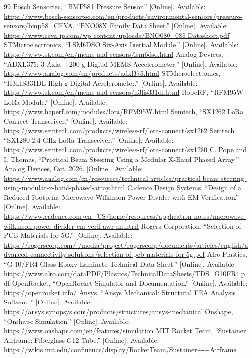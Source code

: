 \documentclass[11pt]{IEEEtran}
\begin{document}
\begin{thebibliography}{99}
 Bosch Sensortec, ``BMP581 Pressure Sensor.'' [Online]. Available: \url{https://www.bosch-sensortec.com/en/products/environmental-sensors/pressure-sensors/bmp581}
 CEVA, ``BNO08X Family Data Sheet.'' [Online]. Available: \url{https://www.ceva-ip.com/wp-content/uploads/BNO080_085-Datasheet.pdf}
 STMicroelectronics, ``LSM6DSO Six-Axis Inertial Module.'' [Online]. Available: \url{https://www.st.com/en/mems-and-sensors/lsm6dso.html}
 Analog Devices, ``ADXL375: 3-Axis, $\pm200$ g Digital MEMS Accelerometer.'' [Online]. Available: \url{https://www.analog.com/en/products/adxl375.html}
 STMicroelectronics, ``H3LIS331DL High-g Digital Accelerometer.'' [Online]. Available: \url{https://www.st.com/en/mems-and-sensors/h3lis331dl.html}
 HopeRF, ``RFM95W LoRa Module.'' [Online]. Available: \url{https://www.hoperf.com/modules/lora/RFM95W.html}
 Semtech, ``SX1262 LoRa Connect Transceiver.'' [Online]. Available: \url{https://www.semtech.com/products/wireless-rf/lora-connect/sx1262}
 Semtech, ``SX1280 2.4-GHz LoRa Transceiver.'' [Online]. Available: \url{https://www.semtech.com/products/wireless-rf/lora-connect/sx1280}
 C. Pope and I. Thomas, ``Practical Beam Steering Using a Modular X-Band Phased Array,'' Analog Devices, Oct. 2026. [Online]. Available: \url{https://www.analog.com/en/resources/technical-articles/practical-beam-steering-using-modular-x-band-phased-array.html}
 Cadence Design Systems, ``Design of a Reduced Footprint Microwave Wilkinson Power Divider with EM Verification.'' [Online]. Available: \url{https://www.cadence.com/en_US/home/resources/application-notes/microwave-wilkinson-power-divider-em-verif-awr-an.html}
 Rogers Corporation, ``Selection of PCB Materials for 5G.'' [Online]. Available: \url{https://rogerscorp.com/-/media/project/rogerscorp/documents/articles/english/advanced-connectivity-solutions/selection-of-pcb-materials-for-5g.pdf}
 Alro Plastics, ``G-10/FR4 Glass-Epoxy Laminate Technical Data Sheet.'' [Online]. Available: \url{https://www.alro.com/dataPDF/Plastics/TechnicalDataSheets/TDS_G10FR4.pdf}
 OpenRocket, ``OpenRocket Simulator and Documentation.'' [Online]. Available: \url{https://openrocket.info/}
 Ansys, ``Ansys Mechanical: Structural FEA Analysis Software.'' [Online]. Available: \url{https://ansys.synopsys.com/products/structures/ansys-mechanical}
 Onshape, ``Onshape Simulation.'' [Online]. Available: \url{https://www.onshape.com/en/features/simulation}
 MIT Rocket Team, ``Sustainer Airframe: Fiberglass G12 Tube.'' [Online]. Available: \url{https://wikis.mit.edu/confluence/display/RocketTeam/Sustainer+-+Airframe}
\end{thebibliography}
\endgroup
\end{document}
